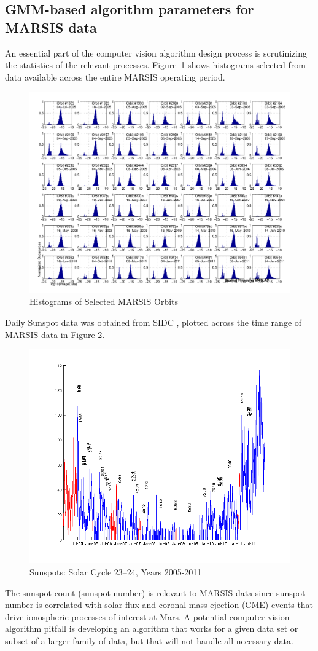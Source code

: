 \subsection{GMM-based algorithm parameters for MARSIS data}
An essential part of the computer vision algorithm design process is scrutinizing the statistics of the relevant processes. 
Figure~\ref{fig:bighisto} shows histograms selected from data available across the entire MARSIS operating period. 
\begin{figure}
	\centering
	\includegraphics[trim=5 220 15 30,clip,width=.95\linewidth]{gfx/Histo}
	\caption{Histograms of Selected MARSIS Orbits}\label{fig:bighisto}
\end{figure}
Daily Sunspot data was obtained from SIDC \citet{sidc}, plotted across the time range of MARSIS data in Figure \ref{fig:sunspots}.
\begin{figure}
	\centering
	\includegraphics[trim=50 40 50 70,clip,width=.5\linewidth]{gfx/Sunspots}
	\caption{Sunspots: Solar Cycle 23--24, Years 2005-2011}\label{fig:sunspots}
\end{figure} 
The sunspot count (sunspot number) is relevant to MARSIS data since sunspot number is correlated with solar flux and coronal mass ejection (CME) events \citep{webb1994} that drive ionospheric processes of interest at Mars.
A potential computer vision algorithm pitfall is developing an algorithm that works for a given data set or subset of a larger family of data, but that will not handle all necessary data. 

